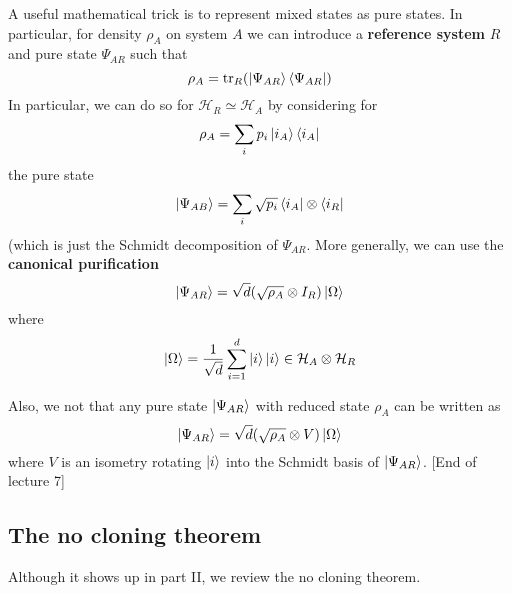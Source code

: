 \documentclass{article}
\theoremstyle{definition}
\begin{document}
A useful mathematical trick is to represent mixed states as pure states. In
particular, for density $\rho_A$ on system $A$ we can introduce a 
\textbf{reference system} $R$ and pure state $\Psi_{AR}$ such that
\begin{equation}
  \rho_A = \tr_R ( \ket{\Psi_{AR}} \bra{\Psi_{AR}} )
\end{equation}
In particular, we can do so for $\mathcal{H}_R \simeq \mathcal{H}_A$ by considering 
for
\begin{equation}
  \rho_A = \sum_i p_i \ket{i_A} \bra{i_A}
\end{equation}
the pure state
\begin{equation}
  \ket{\Psi_{AB}} = \sum_i \sqrt{p_i} \bra{i_A} \otimes \bra{i_R}
\end{equation}
(which is just the Schmidt decomposition of $\Psi_{AR}$. More generally, we can 
use the \textbf{canonical purification}
\begin{equation}
  \ket{\Psi_{AR}} = \sqrt{d} (\sqrt{\rho_A} \otimes I_R ) \ket{\Omega}
\end{equation}
where
\begin{equation}
  \ket{\Omega} = \frac{1}{\sqrt{d}} \sum_{i=1}^d \ket{i}\ket{i} \in
  \mathcal{H}_A \otimes \mathcal{H}_R
\end{equation}

Also, we not that any pure state $\ket{\Psi_{AR}}$ with reduced state $\rho_A$ can
be written as 
\begin{equation}
  \ket{\Psi_{AR}} = \sqrt{d} (\sqrt{\rho_A} \otimes V) \ket{\Omega}
\end{equation}
where $V$ is an isometry rotating $\ket{i}$ into the Schmidt basis of 
$\ket{\Psi_{AR}}$. [End of lecture 7]

\subsection{The no cloning theorem}

Although it shows up in part II, we review the no cloning theorem.
\end{document}
